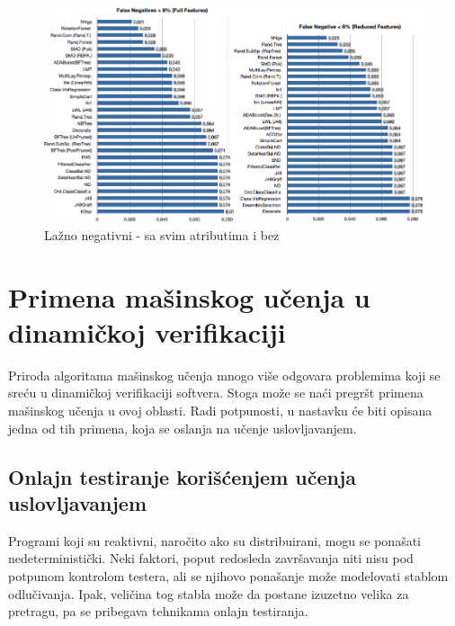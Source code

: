 \documentclass[a4paper]{article}
\theoremstyle{definition}
\begin{document}
{\begin{figure}[h!]
\centering
\includegraphics[width=\textwidth]{false_negative.png}
\caption{Lažno negativni - sa svim atributima i bez}
\label{fig:falseNeg}
\end{figure}

\section{Primena mašinskog učenja u dinamičkoj verifikaciji}
\label{sec:dinamcikaPrimena}

Priroda algoritama mašinskog učenja mnogo više odgovara problemima koji se sreću 
u dinamičkoj verifikaciji softvera. Stoga može se naći pregršt primena mašinskog 
učenja u ovoj oblasti. Radi potpunosti, u nastavku će biti opisana jedna od tih 
primena, koja se oslanja na učenje uslovljavanjem.


\subsection{Onlajn testiranje korišćenjem učenja uslovljavanjem }

Programi koji su reaktivni, naročito ako su distribuirani, mogu se ponašati nedeterministički. Neki faktori, poput redosleda završavanja niti nisu pod potpunom kontrolom testera, ali se njihovo ponašanje može modelovati stablom odlučivanja. Ipak, veličina tog stabla može da postane izuzetno velika za pretragu, pa se pribegava tehnikama onlajn testiranja.

}
\end{document}
